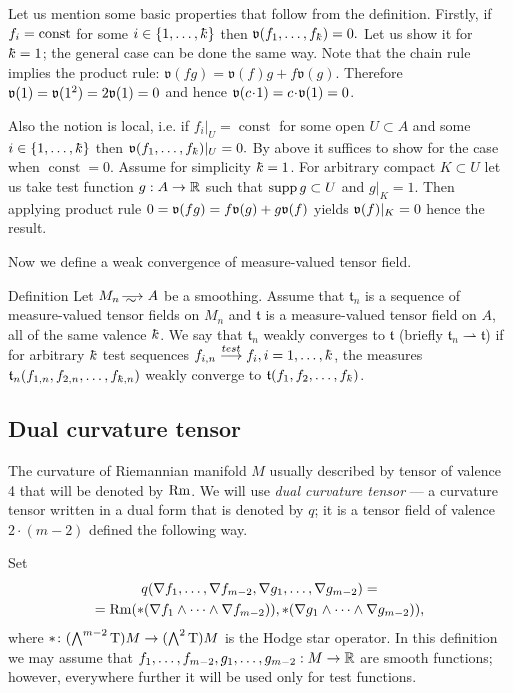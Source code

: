 Let us mention some basic properties that follow 
from the definition.
Firstly, if $f_i=\mathrm{const}$  for some $i\in\{1,\dots,\kay\}$ 
then $\mathfrak{v}(f_1,\dots,f_\kay)=0.$
Let us show it for $\kay=1$; the general case can be done the same way.
Note that the chain rule implies the
product rule:
$\mathfrak{v}(fg)=\mathfrak{v}(f)g+f\mathfrak{v}(g)$.
Therefore $\mathfrak{v}(1)=\mathfrak{v}(1^2)=2\mathfrak{v}(1)=0$ and hence
$\vv(c\cdot 1)=c\cdot\vv(1)=0$.



Also the notion is local,
i.e. if $f_i|_{U}=\operatorname{const}$
for some open $U\subset A$ and some $i\in\{1,\dots,\kay\}$ 
 then $\mathfrak{v}(f_1,\dots,f_\kay)|_U=0.$
By above it suffices to show
for the case when $\operatorname{const}=0$.
Assume for simplicity  $\kay=1$. 
For arbitrary compact $K\subset U$  let
us take test function $g:A\to\mathbb{R}$ such that
$\operatorname{supp} g\subset U$ and $g|_K=1$. Then applying product rule
 $0=\mathfrak{v}(fg)=f\mathfrak{v}(g)+g\mathfrak{v}(f)$ yields 
$\mathfrak{v}(f)|_K=0$ hence 
 the result.
 




Now we define a weak convergence of measure-valued tensor field.

\begin{rdef} {Definition}
Let $M_n\smooths{} A$ be a smoothing.
Assume that $\mathfrak{t}_n$ is a sequence of %
 measure-valued tensor fields on $M_n$  and $\mathfrak{t}$ is a
measure-valued tensor field on $A$,
all of the same valence $\kay$.
We say that $\mathfrak{t}_n$ weakly converges to  $\mathfrak{t}$
(briefly $\mathfrak{t}_n\rightharpoonup\mathfrak{t}$) if for arbitrary $\kay$
test sequences 
$f_{i,n}\testto f_i, i=1,\dots,\kay$, the measures $\mathfrak{t}_n(f_{1,n},f_{2,n},\dots,f_{\kay,n})$ weakly converge to $\mathfrak{t}(f_{1},f_{2},\dots,f_{\kay})$.
\end{rdef}

\subsection{Dual curvature tensor}

The curvature of Riemannian manifold $M$ usually described by tensor of valence 4 that will be denoted by $\operatorname{Rm}$.
We will use \emph{dual curvature tensor} --- 
a curvature tensor written in a dual form that is denoted by $q$;
it is a tensor field of valence $2\cdot(m-2)$ defined the following way.

Set
\begin{multline*}
q(\nabla f_1,\dots,\nabla f_{m-2},\nabla g_1,\dots,\nabla g_{m-2})
=
\\
= 
\operatorname{Rm}(*(\nabla f_1\wedge\dots\wedge \nabla f_{m-2})), *(\nabla g_1\wedge\dots\wedge \nabla g_{m-2})),
\end{multline*}
where ${*}\colon(\bigwedge^{m-2}\text{\rm T})M\to(\bigwedge^2\text{\rm T})M$ is the  Hodge star operator.
In this definition we may assume that $f_1,\dots,f_{m-2},g_1,\dots,g_{m-2}:M\to\mathbb{R}$ are smooth functions; however, everywhere further it will be used only for test functions.

